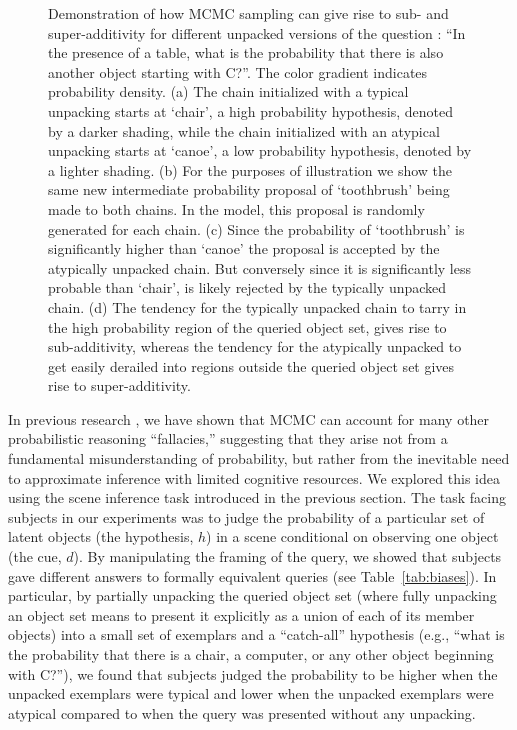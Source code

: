 \begin{figure}
\begin{center}
\caption{Demonstration of how MCMC sampling can give rise to sub- and super-additivity for different unpacked versions of the question : ``In the presence of a table, what is the probability that there is also another object starting with C?''. The color gradient indicates probability density. (a) The chain initialized with a typical unpacking starts at `chair', a high probability hypothesis, denoted by a darker shading, while the chain initialized with an atypical unpacking starts at `canoe', a low probability hypothesis, denoted by a lighter shading. 
(b) For the purposes of illustration we show the same new intermediate probability proposal of `toothbrush' being made to both chains. In the model, this proposal is randomly generated for each chain. %
(c) Since the probability of `toothbrush' is significantly higher than `canoe' the proposal is accepted by the atypically unpacked chain. But conversely since it is significantly less probable than `chair', is likely rejected by the typically unpacked chain.
(d) The tendency for the typically unpacked chain to tarry in the high probability region of the queried object set, gives rise to sub-additivity, whereas the tendency for the atypically unpacked to get easily derailed into regions outside the queried object set gives rise to super-additivity.}
\label{fig:demo}
\end{center}
\end{figure}

In previous research \citep{dasgupta17}, we have shown that MCMC can account for many other probabilistic reasoning ``fallacies,'' suggesting that they arise not from a fundamental misunderstanding of probability, but rather from the inevitable need to approximate inference with limited cognitive resources. We explored this idea using the scene inference task introduced in the previous section. The task facing subjects in our experiments was to judge the probability of a particular set of latent objects (the hypothesis, $h$) in a scene conditional on observing one object (the cue, $d$). By manipulating the framing of the query, we showed that subjects gave different answers to formally equivalent queries (see Table~\ref{tab:biases}). In particular, by partially unpacking the queried object set (where fully unpacking an object set means to present it explicitly as a union of each of its member objects) into a small set of exemplars and a ``catch-all'' hypothesis (e.g., ``what is the probability that there is a chair, a computer, or any other object beginning with C?''), we found that subjects judged the probability to be higher when the unpacked exemplars were typical \citep[a ``subadditivity'' effect; cf.][]{tversky94} and lower when the unpacked exemplars were atypical \citep[a ``superadditivity'' effect; cf.][]{sloman04} compared to when the query was presented without any unpacking.

